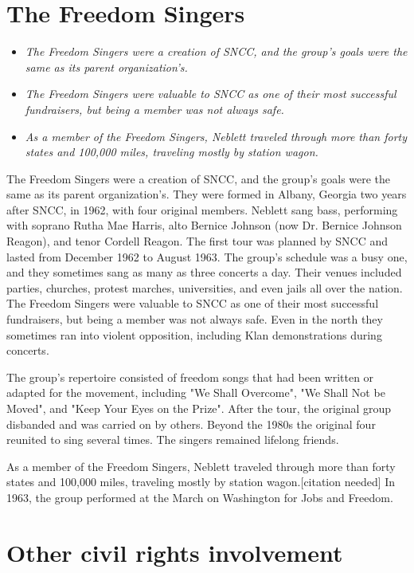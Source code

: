 \section{The Freedom Singers}\label{the-freedom-singers}

\begin{itemize}
\item
  \emph{The Freedom Singers were a creation of SNCC, and the group's
  goals were the same as its parent organization's.}
\item
  \emph{The Freedom Singers were valuable to SNCC as one of their most
  successful fundraisers, but being a member was not always safe.}
\item
  \emph{As a member of the Freedom Singers, Neblett traveled through
  more than forty states and 100,000 miles, traveling mostly by station
  wagon.}
\end{itemize}

The Freedom Singers were a creation of SNCC, and the group's goals were
the same as its parent organization's. They were formed in Albany,
Georgia two years after SNCC, in 1962, with four original members.
Neblett sang bass, performing with soprano Rutha Mae Harris, alto
Bernice Johnson (now Dr. Bernice Johnson Reagon), and tenor Cordell
Reagon. The first tour was planned by SNCC and lasted from December 1962
to August 1963. The group's schedule was a busy one, and they sometimes
sang as many as three concerts a day. Their venues included parties,
churches, protest marches, universities, and even jails all over the
nation. The Freedom Singers were valuable to SNCC as one of their most
successful fundraisers, but being a member was not always safe. Even in
the north they sometimes ran into violent opposition, including Klan
demonstrations during concerts.

The group's repertoire consisted of freedom songs that had been written
or adapted for the movement, including "We Shall Overcome", "We Shall
Not be Moved", and "Keep Your Eyes on the Prize". After the tour, the
original group disbanded and was carried on by others. Beyond the 1980s
the original four reunited to sing several times. The singers remained
lifelong friends.

As a member of the Freedom Singers, Neblett traveled through more than
forty states and 100,000 miles, traveling mostly by station
wagon.{[}citation needed{]} In 1963, the group performed at the March on
Washington for Jobs and Freedom.

\section{Other civil rights
involvement}\label{other-civil-rights-involvement}

